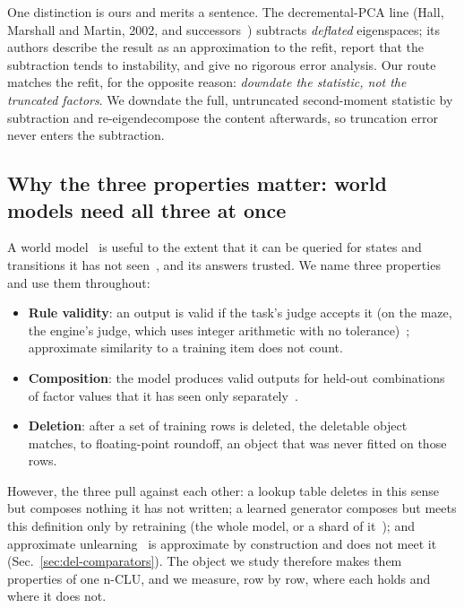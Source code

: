 \documentclass{article} %
\begin{document}
One distinction is ours and merits a sentence. The decremental-PCA
line (Hall, Marshall and Martin, 2002\nocite{hall2002adding}, and successors~\citep{jin2014evd,lee2021fast}) subtracts \emph{deflated} eigenspaces;
its authors describe the result as an approximation to the refit, report that the subtraction
tends to instability, and give no rigorous error analysis. Our route matches the refit, for the opposite reason: \emph{downdate the statistic, not the truncated factors}. We downdate the full,
untruncated second-moment statistic by subtraction and re-eigendecompose the content
afterwards, so truncation error never enters the subtraction.

\subsection{Why the three properties matter: world models need all three at once}
\label{sec:why}

A world model~\citep{ha2018world,hafner2025mastering} is useful to the extent that it can be queried for states and transitions it has
not seen~\citep{valevski2025diffusion}, and its answers trusted. We name three properties and use them throughout:
\begin{itemize}
\item \textbf{Rule validity}: an output is valid if the task's judge accepts it (on the maze, the engine's judge, which
uses integer arithmetic with no tolerance)~\citep{vafa2024evaluating}; approximate similarity to a training item does not count.
\item \textbf{Composition}: the model produces valid outputs for held-out combinations of
  factor values that it has seen only separately~\citep{zhao2022toward}.
\item \textbf{Deletion}: after a set of training rows
is deleted, the deletable object matches, to floating-point roundoff, an object that was never fitted
on those rows.
\end{itemize}
However, the three pull against each other: a lookup table deletes in this sense but
composes nothing it has not written; a learned generator composes but meets this definition only by
retraining (the whole model, or a shard of it~\citep{bourtoule2021machine}); and approximate unlearning~\citep{guo2020certified,golatkar2020eternal} is approximate by construction and does not meet it (Sec.~\ref{sec:del-comparators}). The object we study therefore makes them properties of one n-CLU, and we measure, row by row, where each holds and where it does not.
\end{document}
